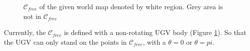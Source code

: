 \documentclass[12pt,draftcls,onecolumn]{IEEEtran}
\begin{document}
\begin{figure}[htp]
  \centering
  \quad
  \caption{ $\mathcal{C}_{free}$  of the given world map denoted by white region. Grey area is not in  $\mathcal{C}_{free}$ }
  \label{fig:8}
\end{figure}




Currently, the  $\mathcal{C}_{free}$ is defined with a non-rotating UGV body (Figure \ref{fig:8}).
So that the UGV can only stand on the points in $\mathcal{C}_{free}$, with a  $\theta =0 $ or $\theta = pi$.
\end{document}
